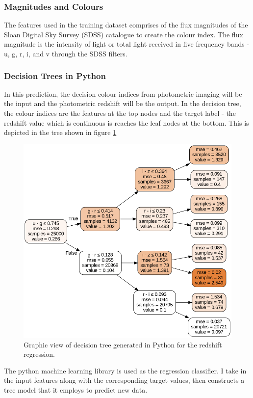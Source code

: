 \subsubsection{Magnitudes and Colours}
The features used in the training dataset comprises of the flux magnitudes of the Sloan Digital Sky Survey (SDSS) catalogue to create the colour index. The flux magnitude is the intensity of light or total light received in five frequency bands - u, g, r, i, and v through the SDSS filters.

\subsubsection{Decision Trees in Python}
In this prediction, the decision colour indices from photometric imaging will be the input and the photometric redshift will be the output. In the decision tree, the colour indices are the features at the top nodes and the target label - the redshift value which is continuous is reaches the leaf nodes at the bottom. This is depicted in the tree shown in figure \ref{fig:tree}
\begin{figure}[H]
	\centering
	\includegraphics[width=\linewidth,keepaspectratio]{images/misc/d.png}
	\caption{Graphic view of decision tree generated in Python for the redshift regression.}
	\label{fig:tree}
\end{figure}

The python machine learning library  is used as the regression classifier. I take in the input features along with the corresponding target values, then constructs a tree model that it employs to predict new data.

